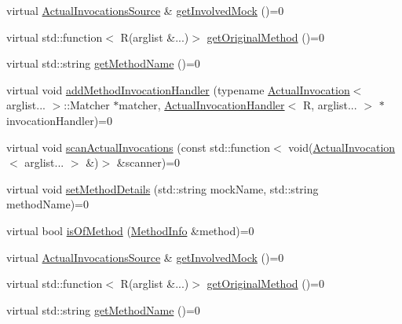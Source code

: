 \begin{DoxyCompactItemize}
\item 
virtual \mbox{\hyperlink{structfakeit_1_1ActualInvocationsSource}{Actual\+Invocations\+Source}} \& \mbox{\hyperlink{structfakeit_1_1MethodMockingContext_1_1Context_aab7f9487475b01f85e81b76cdf6c4860}{get\+Involved\+Mock}} ()=0
\item 
virtual std\+::function$<$ R(arglist \&...)$>$ \mbox{\hyperlink{structfakeit_1_1MethodMockingContext_1_1Context_a1878bb27937f4984d5c43e20c2b0b626}{get\+Original\+Method}} ()=0
\item 
virtual std\+::string \mbox{\hyperlink{structfakeit_1_1MethodMockingContext_1_1Context_ab5f7cc2c8d00214baacaad4c49ccf17f}{get\+Method\+Name}} ()=0
\item 
virtual void \mbox{\hyperlink{structfakeit_1_1MethodMockingContext_1_1Context_a87b3a2d95daf8aaa2ae56b49e032c275}{add\+Method\+Invocation\+Handler}} (typename \mbox{\hyperlink{structfakeit_1_1ActualInvocation}{Actual\+Invocation}}$<$ arglist... $>$\+::Matcher $\ast$matcher, \mbox{\hyperlink{structfakeit_1_1ActualInvocationHandler}{Actual\+Invocation\+Handler}}$<$ R, arglist... $>$ $\ast$invocation\+Handler)=0
\item 
virtual void \mbox{\hyperlink{structfakeit_1_1MethodMockingContext_1_1Context_a89b30ea54bcf5e55c19696f77ad8423b}{scan\+Actual\+Invocations}} (const std\+::function$<$ void(\mbox{\hyperlink{structfakeit_1_1ActualInvocation}{Actual\+Invocation}}$<$ arglist... $>$ \&)$>$ \&scanner)=0
\item 
virtual void \mbox{\hyperlink{structfakeit_1_1MethodMockingContext_1_1Context_a9eb0cf6ed84ea4bd63333503bd6bdc1a}{set\+Method\+Details}} (std\+::string mock\+Name, std\+::string method\+Name)=0
\item 
virtual bool \mbox{\hyperlink{structfakeit_1_1MethodMockingContext_1_1Context_a126835068d4a7bcbf01f47080e690510}{is\+Of\+Method}} (\mbox{\hyperlink{structfakeit_1_1MethodInfo}{Method\+Info}} \&method)=0
\item 
virtual \mbox{\hyperlink{structfakeit_1_1ActualInvocationsSource}{Actual\+Invocations\+Source}} \& \mbox{\hyperlink{structfakeit_1_1MethodMockingContext_1_1Context_aab7f9487475b01f85e81b76cdf6c4860}{get\+Involved\+Mock}} ()=0
\item 
virtual std\+::function$<$ R(arglist \&...)$>$ \mbox{\hyperlink{structfakeit_1_1MethodMockingContext_1_1Context_a1878bb27937f4984d5c43e20c2b0b626}{get\+Original\+Method}} ()=0
\item 
virtual std\+::string \mbox{\hyperlink{structfakeit_1_1MethodMockingContext_1_1Context_ab5f7cc2c8d00214baacaad4c49ccf17f}{get\+Method\+Name}} ()=0

\end{DoxyCompactItemize}
